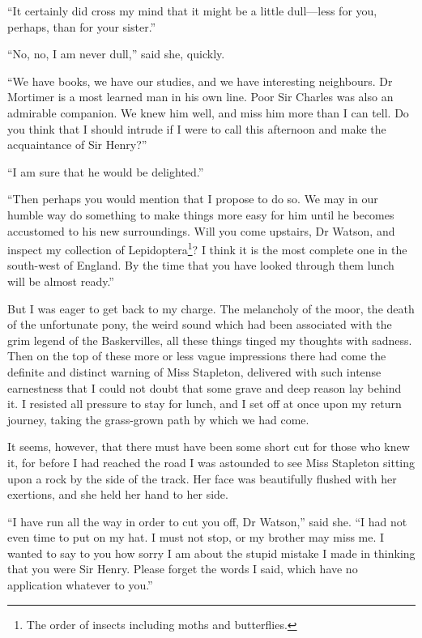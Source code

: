 \documentclass[paper=a5,BCOR=7mm,twoside,DIV=calc,12pt,usegeometry,openany,chapterprefix,endperiod,headings=big]{scrbook} %
\begin{document}
\enquote{It certainly did cross my mind that it might be a little dull---less for you, perhaps, than for your sister.}

\enquote{No, no, I am never dull,} said she, quickly.

\enquote{We have books, we have our studies, and we have interesting neighbours. Dr Mortimer is a most learned man in his own line. Poor Sir Charles was also an admirable companion. We knew him well, and miss him more than I can tell. Do you think that I should intrude if I were to call this afternoon and make the acquaintance of Sir Henry?}

\enquote{I am sure that he would be delighted.}

\enquote{Then perhaps you would mention that I propose to do so. We may in our humble way do something to make things more easy for him until he becomes accustomed to his new surroundings. Will you come upstairs, Dr Watson, and inspect my collection of Lepidoptera\footnote{The order of insects including moths and butterflies.}? I think it is the most complete one in the south-west of England. By the time that you have looked through them lunch will be almost ready.}

But I was eager to get back to my charge. The melancholy of the moor, the death of the unfortunate pony, the weird sound which had been associated with the grim legend of the Baskervilles, all these things tinged my thoughts with sadness. Then on the top of these more or less vague impressions there had come the definite and distinct warning of Miss Stapleton, delivered with such intense earnestness that I could not doubt that some grave and deep reason lay behind it. I resisted all pressure to stay for lunch, and I set off at once upon my return journey, taking the grass-grown path by which we had come.

It seems, however, that there must have been some short cut for those who knew it, for before I had reached the road I was astounded to see Miss Stapleton sitting upon a rock by the side of the track. Her face was beautifully flushed with her exertions, and she held her hand to her side.

\enquote{I have run all the way in order to cut you off, Dr Watson,} said she. \enquote{I had not even time to put on my hat. I must not stop, or my brother may miss me. I wanted to say to you how sorry I am about the stupid mistake I made in thinking that you were Sir Henry. Please forget the words I said, which have no application whatever to you.}
\end{document}
